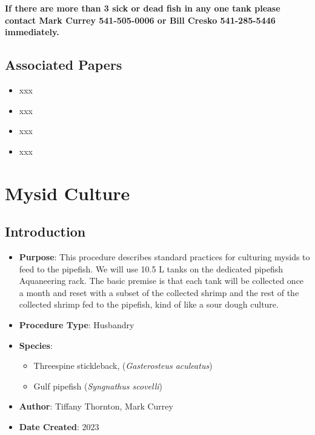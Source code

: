 \documentclass[
  letterpaper,
  DIV=11,
  numbers=noendperiod]{scrreprt}
\providecommand{\tightlist}{%
  \setlength{\itemsep}{0pt}\setlength{\parskip}{0pt}}\usepackage{longtable,booktabs,array}
\begin{document}
\begin{tcolorbox}[enhanced jigsaw, bottomtitle=1mm, rightrule=.15mm, toptitle=1mm, opacitybacktitle=0.6, bottomrule=.15mm, titlerule=0mm, coltitle=black, leftrule=.75mm, arc=.35mm, colback=white, colframe=quarto-callout-important-color-frame, left=2mm, colbacktitle=quarto-callout-important-color!10!white, title=\textcolor{quarto-callout-important-color}{\faExclamation}\hspace{0.5em}{This is a callout IMPORTANT}, toprule=.15mm, opacityback=0, breakable]

\textbf{If there are more than 3 sick or dead fish in any one tank
please contact Mark Currey 541-505-0006 or Bill Cresko 541-285-5446
immediately.}

\end{tcolorbox}

\hypertarget{associated-papers-7}{%
\section{Associated Papers}\label{associated-papers-7}}

\begin{itemize}
\tightlist
\item
  xxx
\item
  xxx
\item
  xxx
\item
  xxx
\end{itemize}

\hypertarget{sec-husb-mysid_culture}{%
\chapter{Mysid Culture}\label{sec-husb-mysid_culture}}

\hypertarget{introduction-14}{%
\section{Introduction}\label{introduction-14}}

\begin{itemize}
\tightlist
\item
  \textbf{Purpose}: This procedure describes standard practices for
  culturing mysids to feed to the pipefish. We will use 10.5 L tanks on
  the dedicated pipefish Aquaneering rack. The basic premise is that
  each tank will be collected once a month and reset with a subset of
  the collected shrimp and the rest of the collected shrimp fed to the
  pipefish, kind of like a sour dough culture.
\item
  \textbf{Procedure Type}: Husbandry
\item
  \textbf{Species}:

  \begin{itemize}
  \tightlist
  \item
    Threespine stickleback, (\emph{Gasterosteus aculeatus})
  \item
    Gulf pipefish (\emph{Syngnathus scovelli})
  \end{itemize}
\item
  \textbf{Author}: Tiffany Thornton, Mark Currey
\item
  \textbf{Date Created}: 2023
\end{itemize}
\end{document}
